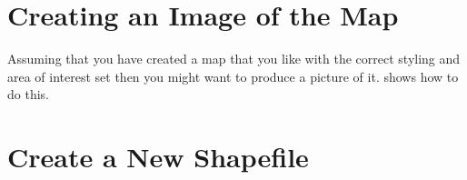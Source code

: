\section{Creating an Image of the Map}
Assuming that you have created a map that you like with the correct styling and area of interest 
set then you might want to produce a picture of it.  shows how to do this.




\section{Create a New Shapefile}




